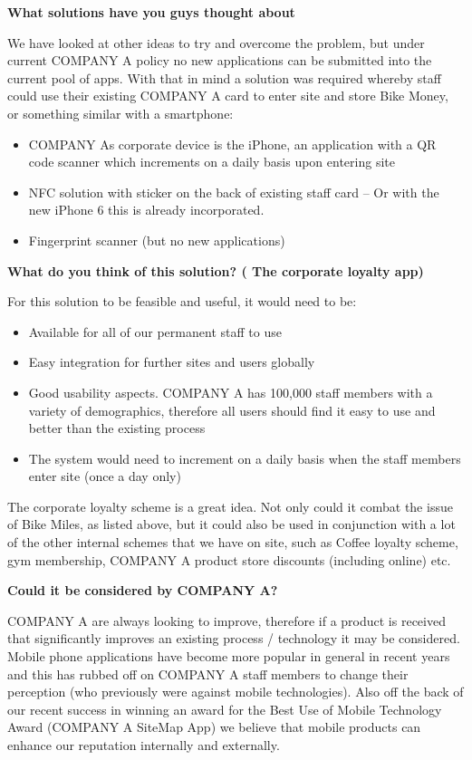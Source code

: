 \textbf{What solutions have you guys thought about}

We have looked at other ideas to try and overcome the problem, but under current COMPANY A policy no new applications can be submitted into the current pool of apps. With that in mind a solution was required whereby staff could use their existing COMPANY A card to enter site and store Bike Money, or something similar with a smartphone:
\begin{itemize}
\item COMPANY As corporate device is the iPhone, an application with a QR code scanner which increments on a daily basis upon entering site
\item NFC solution with sticker on the back of existing staff card – Or with the new iPhone 6 this is already incorporated.
\item Fingerprint scanner (but no new applications)
\end{itemize}

\textbf{What do you think of this solution? ( The corporate loyalty app)}

For this solution to be feasible and useful, it would need to be:
\begin{itemize}
\item Available for all of our permanent staff to use
\item Easy integration for further sites and users globally
\item Good usability aspects. COMPANY A has 100,000 staff members with a variety of demographics, therefore all users should find it easy to use and better than the existing process
\item The system would need to increment on a daily basis when the staff members enter site (once a day only)
\end{itemize}
The corporate loyalty scheme is a great idea. Not only could it combat the issue of Bike Miles, as listed above, but it could also be used in conjunction with a lot of the other internal schemes that we have on site, such as Coffee loyalty scheme, gym membership, COMPANY A product store discounts (including online) etc.

\textbf{Could it be considered by COMPANY A?}

COMPANY A are always looking to improve, therefore if a product is received that significantly improves an existing process / technology it may be considered. Mobile phone applications have become more popular in general in recent years and this has rubbed off on COMPANY A staff members to change their perception (who previously were against mobile technologies). Also off the back of our recent success in winning an award for the Best Use of Mobile Technology Award (COMPANY A SiteMap App) we believe that mobile products can enhance our reputation internally and externally.
